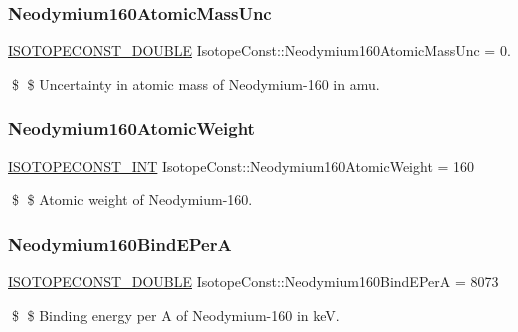 \subsubsection{\texorpdfstring{Neodymium160\+Atomic\+Mass\+Unc}{Neodymium160AtomicMassUnc}}
{\footnotesize\ttfamily \mbox{\hyperlink{group___isotope_const-_macros_ga8f45a7272ce02c0b4c65c44636ed719a}{I\+S\+O\+T\+O\+P\+E\+C\+O\+N\+S\+T\+\_\+\+D\+O\+U\+B\+LE}} Isotope\+Const\+::\+Neodymium160\+Atomic\+Mass\+Unc = 0.}

\$ \$ Uncertainty in atomic mass of Neodymium-\/160 in amu. \mbox{\label{group___isotope_const-_neodymium-_nd160_gafba158a45db58795622e61f0ecb3da19}} 
\subsubsection{\texorpdfstring{Neodymium160\+Atomic\+Weight}{Neodymium160AtomicWeight}}
{\footnotesize\ttfamily \mbox{\hyperlink{group___isotope_const-_macros_ga5f18360b3e99483a35c32d789e62621c}{I\+S\+O\+T\+O\+P\+E\+C\+O\+N\+S\+T\+\_\+\+I\+NT}} Isotope\+Const\+::\+Neodymium160\+Atomic\+Weight = 160}

\$ \$ Atomic weight of Neodymium-\/160. \mbox{\label{group___isotope_const-_neodymium-_nd160_gae0840c2d4cbb15df3bb0e8dff23f5770}} 
\subsubsection{\texorpdfstring{Neodymium160\+Bind\+E\+PerA}{Neodymium160BindEPerA}}
{\footnotesize\ttfamily \mbox{\hyperlink{group___isotope_const-_macros_ga8f45a7272ce02c0b4c65c44636ed719a}{I\+S\+O\+T\+O\+P\+E\+C\+O\+N\+S\+T\+\_\+\+D\+O\+U\+B\+LE}} Isotope\+Const\+::\+Neodymium160\+Bind\+E\+PerA = 8073}

\$ \$ Binding energy per A of Neodymium-\/160 in keV. \mbox{\label{group___isotope_const-_neodymium-_nd160_gadc2c941bff454b26342998d69a918ab8}} 
